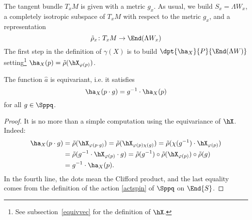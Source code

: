 The tangent bundle $T_xM$ is given with a metric $g_x$. As usual, we build $S_x=\Lambda W _x$, a completely isotropic subspace of $T_xM$ with respect to the metric $g_x$, and a representation
\[
\tilde \rho_x\colon T_xM\to \End(\Lambda W_x)
\]
The first step in the definition of $\gamma(X)$ is to build $\dpt{\ha_X}{P}{\End(\Lambda W )}$ setting\footnote{See subsection~\ref{equivvec} for the definition of $\hX$.} $\ha_X(p)=\tilde\rho(\hX_{\varphi(p)})$.

\begin{lemma}
The function $\hat a$ is equivariant, i.e. it satisfies
\begin{equation}
     \ha_X(p\cdot g)=g^{-1}\cdot\ha_X(p)                             \label{equivaX}
\end{equation}
for all $g\in\Sppq$.
\end{lemma}

\begin{proof}
It is no more than a simple computation using the equivariance of $\hX$. Indeed:
\begin{equation}
\begin{split}
 \ha_X(p\cdot g)&=\tilde\rho(\hX_{\varphi(p\cdot g)})=\tilde\rho(\hX_{\varphi(p)\chi(g)})=\tilde\rho(\chi(g^{-1})\cdot\hX_{\varphi(p)})\\
		&=\tilde\rho(g^{-1}\cdot\hX_{\varphi(p)}\cdot g)=\tilde\rho(g^{-1})\circ\tilde\rho(\hX_{\varphi(p)})\circ\tilde\rho(g)\\
                &=g^{-1}\cdot\ha_X(p).
\end{split}
\end{equation}
In the fourth line, the dots mean the Clifford product, and the last equality comes from the definition of the action \eqref{actspin} of $\Sppq$ on $\End{S}$.
\end{proof}

